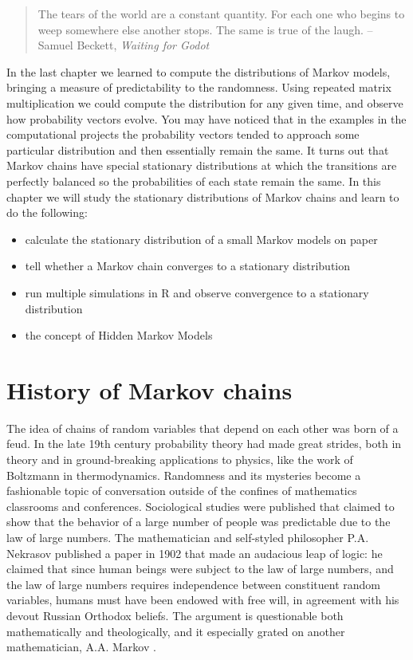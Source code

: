 \documentclass[
]{book}
\providecommand{\tightlist}{%
  \setlength{\itemsep}{0pt}\setlength{\parskip}{0pt}}
\theoremstyle{definition}
\theoremstyle{definition}
\theoremstyle{definition}
\theoremstyle{remark}
\begin{document}
\begin{quote}
The tears of the world are a constant quantity. For each one who begins to weep somewhere else another stops. The same is true of the laugh.
-- Samuel Beckett, \emph{Waiting for Godot}
\end{quote}

In the last chapter we learned to compute the distributions of Markov models, bringing a measure of predictability to the randomness. Using repeated matrix multiplication we could compute the distribution for any given time, and observe how probability vectors evolve. You may have noticed that in the examples in the computational projects the probability vectors tended to approach some particular distribution and then essentially remain the same. It turns out that Markov chains have special stationary distributions at which the transitions are perfectly balanced so the probabilities of each state remain the same. In this chapter we will study the stationary distributions of Markov chains and learn to do the following:

\begin{itemize}
\tightlist
\item
  calculate the stationary distribution of a small Markov models on paper
\item
  tell whether a Markov chain converges to a stationary distribution
\item
  run multiple simulations in R and observe convergence to a stationary distribution
\item
  the concept of Hidden Markov Models
\end{itemize}

\hypertarget{history-of-markov-chains}{%
\section{History of Markov chains}\label{history-of-markov-chains}}

The idea of chains of random variables that depend on each other was born of a feud. In the late 19th century probability theory had made great strides, both in theory and in ground-breaking applications to physics, like the work of Boltzmann in thermodynamics. Randomness and its mysteries become a fashionable topic of conversation outside of the confines of mathematics classrooms and conferences. Sociological studies were published that claimed to show that the behavior of a large number of people was predictable due to the law of large numbers. The mathematician and self-styled philosopher P.A. Nekrasov published a paper in 1902 that made an audacious leap of logic: he claimed that since human beings were subject to the law of large numbers, and the law of large numbers requires independence between constituent random variables, humans must have been endowed with free will, in agreement with his devout Russian Orthodox beliefs. The argument is questionable both mathematically and theologically, and it especially grated on another mathematician, A.A. Markov \citep{hayes_first_2012}.
\end{document}
